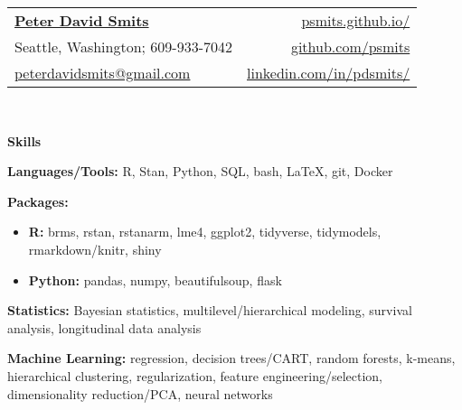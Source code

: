 \documentclass[letterpaper,10pt]{article}
\newcommand{\resheading}[1]{
  {\large \colorbox{mygrey}{\begin{minipage}{\textwidth}{\textbf{#1 \vphantom{p\^{E}}}}\end{minipage}}}
}
\begin{document}
\newcommand{\mywebheader}{
  \begin{tabular*}{7in}{l@{\extracolsep{\fill}}r}
    \textbf{\href{https://psmits.github.io/}{\Large Peter David Smits}} & \href{https://psmits.github.io/}{psmits.github.io/} \\
    Seattle, Washington; 609-933-7042 & \href{https://github.com/psmits}{github.com/psmits} \\
    \href{mailto:peterdavidsmits@gmail.com}{peterdavidsmits@gmail.com} & \href{https://www.linkedin.com/in/pdsmits/}{linkedin.com/in/pdsmits/} \\
  \end{tabular*}
  \\
\vspace{0.05in}
}

\mywebheader



\resheading{Skills}
\begin{description}[itemsep=-1mm]
    \item \textbf{Languages/Tools:}  R, Stan, Python, SQL, bash, \LaTeX, git, Docker
    \item \textbf{Packages:} \vspace{-5pt}
      \begin{itemize}[itemsep=-1mm]
        \item \textbf{R:} brms, rstan, rstanarm, lme4, ggplot2, tidyverse, tidymodels, rmarkdown/knitr, shiny
        \item \textbf{Python:} pandas, numpy, beautifulsoup, flask
      \end{itemize}
    \item \textbf{Statistics:} Bayesian statistics, multilevel/hierarchical modeling, survival analysis, longitudinal data analysis
    \item \textbf{Machine Learning:} regression, decision trees/CART, random forests, k-means, hierarchical clustering, regularization, feature engineering/selection, dimensionality reduction/PCA, neural networks
\end{description} %
\vspace{0.05in}
\end{document}
